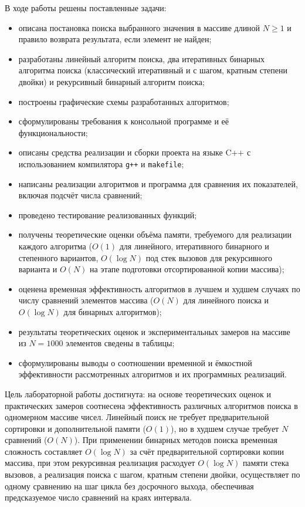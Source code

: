 В ходе работы решены поставленные задачи:
\begin{itemize}
    \item описана постановка поиска выбранного значения в массиве длиной $N \ge 1$ и правило возврата результата, если элемент не найден;    \item разработаны линейный алгоритм поиска, два итеративных бинарных алгоритма поиска (классический итеративный и с шагом, кратным степени двойки) и рекурсивный бинарный алгоритм поиска;
    \item построены графические схемы разработанных алгоритмов;
    \item сформулированы требования к консольной программе и её функциональности;
    \item описаны средства реализации и сборки проекта на языке $\text{C++}$ с использованием компилятора \texttt{g++} и \texttt{makefile};
    \item написаны реализации алгоритмов и программа для сравнения их показателей, включая подсчёт числа сравнений;
    \item проведено тестирование реализованных функций;
    \item получены теоретические оценки объёма памяти, требуемого для реализации каждого алгоритма ($O(1)$ для линейного, итеративного бинарного и степенного вариантов, $O(\log N)$ под стек вызовов для рекурсивного варианта и $O(N)$ на этапе подготовки отсортированной копии массива);
    \item оценена временная эффективность алгоритмов в лучшем и худшем случаях по числу сравнений элементов массива ($O(N)$ для линейного поиска и $O(\log N)$ для бинарных алгоритмов);
    \item результаты теоретических оценок и экспериментальных замеров на массиве из $N = 1000$ элементов сведены в таблицы;
    \item сформулированы выводы о соотношении временной и ёмкостной эффективности рассмотренных алгоритмов и их программных реализаций.
\end{itemize}

Цель лабораторной работы достигнута: на основе теоретических 
оценок и практических замеров соотнесена эффективность 
различных алгоритмов поиска в одномерном массиве чисел. 
Линейный поиск не требует предварительной сортировки и 
дополнительной памяти ($O(1)$), но в худшем случае 
требует $N$ сравнений ($O(N)$). 
При применении бинарных методов поиска временная 
сложность составляет $O(\log N)$ за счёт 
предварительной сортировки копии массива, при этом рекурсивная 
реализация расходует $O(\log N)$ памяти стека вызовов, 
а реализация поиска с шагом, кратным степени двойки, 
осуществляет по одному сравнению на шаг цикла без 
досрочного выхода, обеспечивая предсказуемое число 
сравнений на краях интервала.

